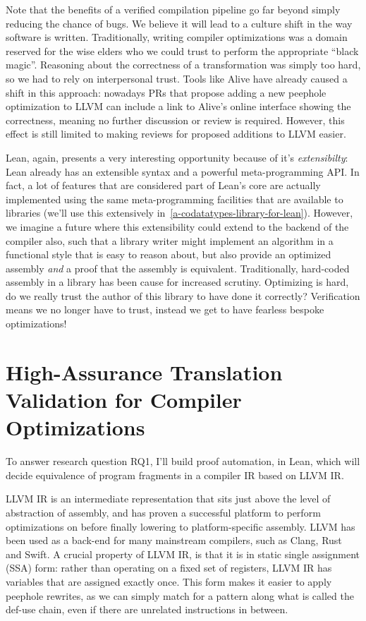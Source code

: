 \documentclass[a4paper]{scrartcl}
\begin{document}
Note that the benefits of a verified compilation pipeline go far beyond
simply reducing the chance of bugs. We believe it will lead to a culture
shift in the way software is written. Traditionally, writing compiler
optimizations was a domain reserved for the wise elders who we could
trust to perform the appropriate ``black magic''. Reasoning about the
correctness of a transformation was simply too hard, so we had to rely
on interpersonal trust. Tools like Alive have already caused a shift in
this approach: nowadays PRs that propose adding a new peephole
optimization to LLVM can include a link to Alive's online interface
showing the correctness, meaning no further discussion or review is
required. However, this effect is still limited to making reviews for
proposed additions to LLVM easier.

Lean, again, presents a very interesting opportunity because of it's
\emph{extensibilty}: Lean already has an extensible syntax and a
powerful meta-programming API. In fact, a lot of features that are
considered part of Lean's core are actually implemented using the same
meta-programming facilities that are available to libraries (we'll use
this extensively in~\autoref{a-codatatypes-library-for-lean}). However, we imagine a future where this
extensibility could extend to the backend of the compiler also, such
that a library writer might implement an algorithm in a functional style
that is easy to reason about, but also provide an optimized assembly
\emph{and} a proof that the assembly is equivalent. Traditionally,
hard-coded assembly in a library has been cause for increased scrutiny.
Optimizing is hard, do we really trust the author of this library to
have done it correctly? Verification means we no longer have to trust,
instead we get to have fearless bespoke optimizations!

\section{High-Assurance Translation Validation for Compiler
Optimizations}\label{high-assurance-translation-validation-for-compiler-optimizations}

To answer research question \textsc{RQ1}, I'll build proof automation, in Lean,
which will decide equivalence of program fragments in a compiler IR based on LLVM IR.

LLVM IR is an intermediate representation that sits just above the level
of abstraction of assembly, and has proven a successful platform to
perform optimizations on before finally lowering to platform-specific
assembly. LLVM has been used as a back-end for many mainstream
compilers, such as Clang, Rust and Swift. A crucial property of LLVM IR, is that it is in static single assignment
(SSA) form: rather than operating on a fixed set of registers, LLVM IR
has variables that are assigned exactly once. This form makes it easier
to apply peephole rewrites, as we can simply match for a pattern along
what is called the def-use chain, even if there are unrelated
instructions in between.
\end{document}
